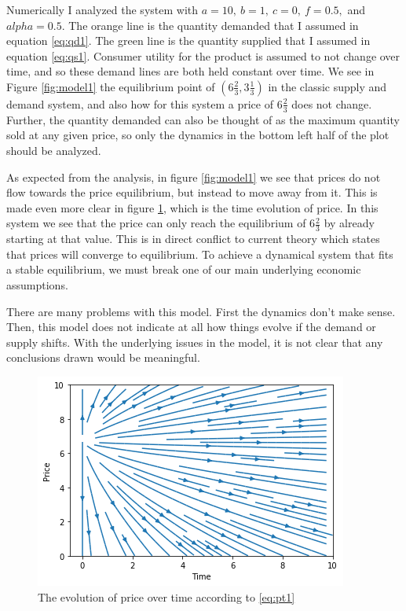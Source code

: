 \documentclass{article}
\begin{document}
Numerically I analyzed the system with $a = 10,\ b = 1,\ c = 0,\ f = 0.5,$ and $alpha = 0.5$. The orange line is the quantity demanded that I assumed in equation \eqref{eq:qd1}. The green line is the quantity supplied that I assumed in equation \eqref{eq:qs1}. Consumer utility for the product is assumed to not change over time, and so these demand lines are both held constant over time. We see in Figure \ref{fig:model1} the equilibrium point of $(6 \frac{2}{3}, 3 \frac{1}{3})$ in the classic supply and demand system, and also how for this system a price of $6 \frac{2}{3}$ does not change. Further, the quantity demanded can also be thought of as the maximum quantity sold at any given price, so only the dynamics in the bottom left half of the plot should be analyzed.

As expected from the analysis, in figure \ref{fig:model1} we see that prices do not flow towards the price equilibrium, but instead to move away from it. This is made even more clear in figure \ref{fig:model1_time_price}, which is the time evolution of price. In this system we see that the price can only reach the equilibrium of $6 \frac{2}{3}$ by already starting at that value. This is in direct conflict to current theory which states that prices will converge to equilibrium. To achieve a dynamical system that fits a stable equilibrium, we must break one of our main underlying economic assumptions.

There are many problems with this model. First the dynamics don't make sense. Then, this model does not indicate at all how things evolve if the demand or supply shifts.  With the underlying issues in the model, it is not clear that any conclusions drawn would be meaningful. 

	\begin{figure}
		\centering
			\includegraphics[width = 0.6\columnwidth]{Figures/simple_priceOverTime.png}
		\caption{The evolution of price over time according to \eqref{eq:pt1}}
		\label{fig:model1_time_price} 
	\end{figure}
\end{document}
